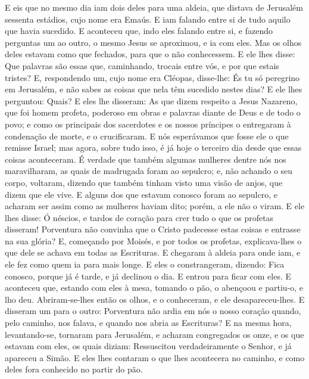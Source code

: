 E eis que no mesmo dia iam dois deles para uma aldeia, que
distava de Jerusalém sessenta estádios, cujo nome era Emaús.
E iam falando entre si de tudo aquilo que havia sucedido.
E aconteceu que, indo eles falando entre si, e fazendo
perguntas um ao outro, o mesmo Jesus se aproximou, e ia com eles.
Mas os olhos deles estavam como que fechados, para que o não
conhecessem. E ele lhes disse: Que palavras são essas que,
caminhando, trocais entre vós, e por que estais tristes? E,
respondendo um, cujo nome era Cléopas, disse-lhe: És tu só peregrino
em Jerusalém, e não sabes as coisas que nela têm sucedido nestes
dias? E ele lhes perguntou: Quais? E eles lhe disseram: As
que dizem respeito a Jesus Nazareno, que foi homem profeta, poderoso
em obras e palavras diante de Deus e de todo o povo; e como
os principais dos sacerdotes e os nossos príncipes o entregaram à
condenação de morte, e o crucificaram. E nós esperávamos que
fosse ele o que remisse Israel; mas agora, sobre tudo isso, é já
hoje o terceiro dia desde que essas coisas aconteceram. É
verdade que também algumas mulheres dentre nós nos maravilharam, as
quais de madrugada foram ao sepulcro; e, não achando o seu
corpo, voltaram, dizendo que também tinham visto uma visão de anjos,
que dizem que ele vive. E alguns dos que estavam conosco
foram ao sepulcro, e acharam ser assim como as mulheres haviam dito;
porém, a ele não o viram. E ele lhes disse: Ó néscios, e
tardos de coração para crer tudo o que os profetas disseram!
Porventura não convinha que o Cristo padecesse estas coisas e
entrasse na sua glória? E, começando por Moisés, e por todos
os profetas, explicava-lhes o que dele se achava em todas as
Escrituras. E chegaram à aldeia para onde iam, e ele fez como
quem ia para mais longe. E eles o constrangeram, dizendo:
Fica conosco, porque já é tarde, e já declinou o dia. E entrou para
ficar com eles. E aconteceu que, estando com eles à mesa,
tomando o pão, o abençoou e partiu-o, e lho deu.
Abriram-se-lhes então os olhos, e o conheceram, e ele
desapareceu-lhes. E disseram um para o outro: Porventura não
ardia em nós o nosso coração quando, pelo caminho, nos falava, e
quando nos abria as Escrituras? E na mesma hora,
levantando-se, tornaram para Jerusalém, e acharam congregados os
onze, e os que estavam com eles, os quais diziam: Ressuscitou
verdadeiramente o Senhor, e já apareceu a Simão. E eles lhes
contaram o que lhes acontecera no caminho, e como deles fora
conhecido no partir do pão.

